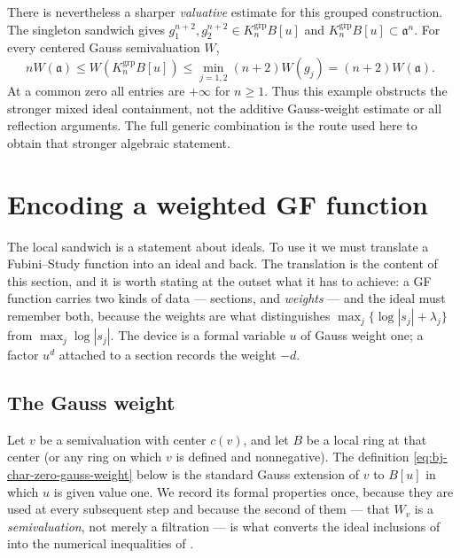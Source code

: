 \begin{example}
There is nevertheless a sharper \emph{valuative} estimate for this
grouped construction.  The singleton sandwich gives
$g_1^{n+2},g_2^{n+2}\in K_n^{\mathrm{grp}}B[u]$ and
$K_n^{\mathrm{grp}}B[u]\subset\mathfrak a^n$.  For every centered
Gauss semivaluation $W$,
\[
 nW(\mathfrak a)\le W(K_n^{\mathrm{grp}}B[u])
 \le\min_{j=1,2}(n+2)W(g_j)=(n+2)W(\mathfrak a).
\]
At a common zero all entries are $+\infty$ for $n\ge1$.
Thus this example obstructs the stronger mixed ideal containment,
not the additive Gauss-weight estimate or all reflection arguments.
The full generic combination is the route used here to obtain that
stronger algebraic statement.
\end{example}

\section{Encoding a weighted GF function}
\label{sec:ch44-encoding}

The local sandwich is a statement about ideals.  To use it we must translate
a Fubini--Study function into an ideal and back.  The translation is the
content of this section, and it is worth stating at the outset what it has
to achieve: a GF function carries two kinds of data --- sections, and
\emph{weights} --- and the ideal must remember both, because the weights are
what distinguishes $\max_j\{\log|s_j|+\lambda_j\}$ from
$\max_j\log|s_j|$.  The device is a formal variable $u$ of Gauss weight
one; a factor $u^d$ attached to a section records the weight $-d$.

\subsection{The Gauss weight}
\label{sec:ch44-gauss}

Let $v$ be a semivaluation with center $c(v)$, and let $B$ be a local
ring at that center (or any ring on which $v$ is defined and nonnegative).
The definition \eqref{eq:bj-char-zero-gauss-weight} below is the standard
Gauss extension of $v$ to $B[u]$ in which $u$ is given value one.  We
record its formal properties once, because they are used at every subsequent
step and because the second of them --- that $W_v$ is a
\emph{semivaluation}, not merely a filtration --- is what converts the ideal inclusions of
 into the numerical inequalities of
.

